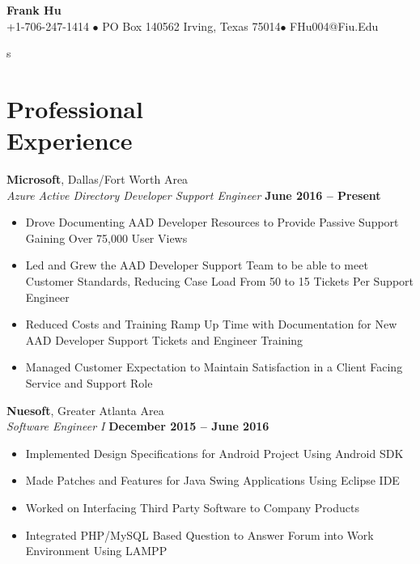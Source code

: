 \documentclass[margin,line]{resume}
\begin{document}
	{\centering \LARGE{\textbf{Frank Hu}}}
	\\
	\normalsize
	+1-706-247-1414 $\bullet$ PO Box 140562 Irving, Texas 75014$\bullet$ FHu004@Fiu.Edu
	
	\begin{resume}s
	
		
	\section{\mysidestyle Professional\\Experience}
	
	\textbf{Microsoft}, Dallas/Fort Worth Area \vspace{1mm}\\\vspace{1mm}
	\textsl{Azure Active Directory Developer Support Engineer} \hfill \textbf{June 2016 -- Present}
	\begin{itemize}
		 \item Drove Documenting AAD Developer Resources to Provide Passive Support Gaining Over 75,000 User Views	
		 \item Led and Grew the AAD Developer Support Team to be able to meet Customer Standards, Reducing Case Load From 50 to 15 Tickets Per Support Engineer 
		 \item Reduced Costs and Training Ramp Up Time with Documentation for New AAD Developer Support Tickets and Engineer Training 
		\item Managed Customer Expectation to Maintain Satisfaction in a Client
		Facing Service and Support Role
	
	\end{itemize}

	\textbf{Nuesoft}, Greater Atlanta Area \vspace{1mm}\\\vspace{1mm}%
	\textsl{Software Engineer I} \hfill \textbf{December 2015 -- June 2016}
	\begin{itemize}
	 	\item Implemented Design Specifications for Android Project Using Android SDK
	 	\item Made Patches and Features for Java Swing Applications Using Eclipse IDE 
	 	\item Worked on Interfacing Third Party Software to Company Products
	 	\item Integrated PHP/MySQL Based Question to Answer Forum into Work Environment Using LAMPP
	\end{itemize}
	

\end{resume}
\end{document}
